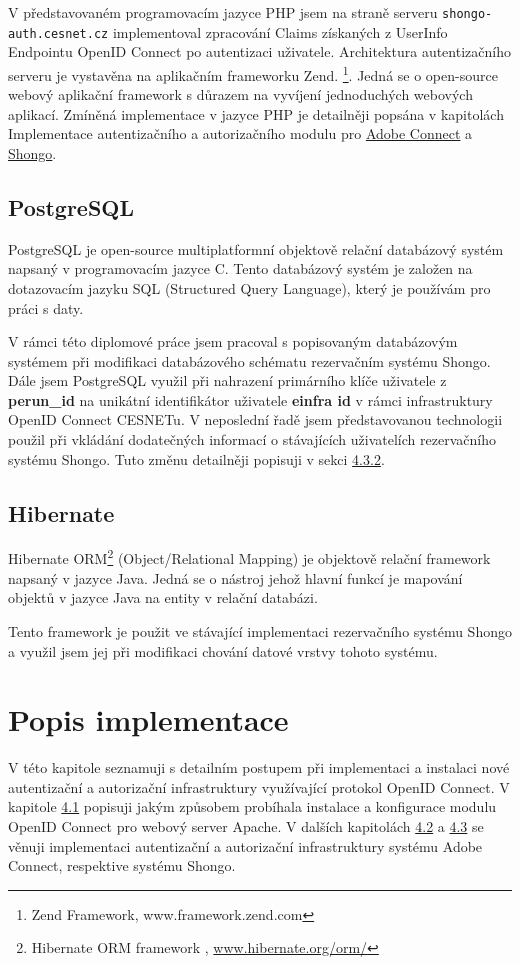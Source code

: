 \documentclass[
  printed, %
  twoside, %
  table,   %
  nolof,     %
  nolot,     %
]{fithesis3}
\begin{document}
V představovaném programovacím jazyce PHP jsem na straně serveru \texttt{shongo-auth.cesnet.cz} implementoval zpracování Claims získaných z UserInfo Endpointu OpenID Connect po autentizaci uživatele. Architektura autentizačního serveru je vystavěna na aplikačním frameworku Zend. \footnote{Zend Framework, www.framework.zend.com}. Jedná se o open-source webový aplikační framework s důrazem na vyvíjení jednoduchých webových aplikací. Zmíněná implementace v jazyce PHP je detailněji popsána v kapitolách Implementace autentizačního a autorizačního modulu pro \hyperref[ACImpl]{Adobe Connect} a \hyperref[ShongoImpl]{Shongo}. \par

\section{PostgreSQL}
PostgreSQL \cite{postgresql} je open-source multiplatformní objektově relační databázový systém napsaný v programovacím jazyce C. Tento databázový systém je založen na dotazovacím jazyku SQL (Structured Query Language), který je používám pro práci s daty. 
\par

V rámci této diplomové práce jsem pracoval s popisovaným databázovým systémem při modifikaci databázového schématu rezervačním systému Shongo. Dále jsem PostgreSQL využil při nahrazení primárního klíče uživatele z \textbf{perun\_id} na unikátní identifikátor uživatele  \textbf{einfra id} v rámci infrastruktury OpenID Connect CESNETu. V neposlední řadě jsem představovanou technologii použil při vkládání dodatečných informací o stávajících uživatelích rezervačního systému Shongo. Tuto změnu detailněji popisuji v sekci \hyperref[ShongoImpl-web]{4.3.2}. 

\section{Hibernate}
Hibernate ORM\footnote{Hibernate ORM framework , \url{www.hibernate.org/orm/}} (Object/Relational Mapping) je objektově relační framework napsaný v jazyce Java. Jedná se o nástroj jehož hlavní funkcí je mapování objektů v jazyce Java na entity v relační databázi.
\par
Tento framework je použit ve stávající implementaci rezervačního systému Shongo a využil jsem jej při modifikaci chování datové vrstvy tohoto systému.  


\chapter{Popis implementace}
V této kapitole seznamuji s detailním postupem při implementaci a instalaci nové autentizační a autorizační infrastruktury využívající protokol OpenID Connect. V kapitole \hyperref[apacheConfig]{4.1} popisuji jakým způsobem probíhala instalace a konfigurace modulu OpenID Connect pro webový server Apache. V dalších kapitolách \hyperref[ACImpl]{4.2} a \hyperref[ShongoImpl]{4.3} se věnuji implementaci autentizační a autorizační infrastruktury systému Adobe Connect, respektive systému Shongo.   
\end{document}

